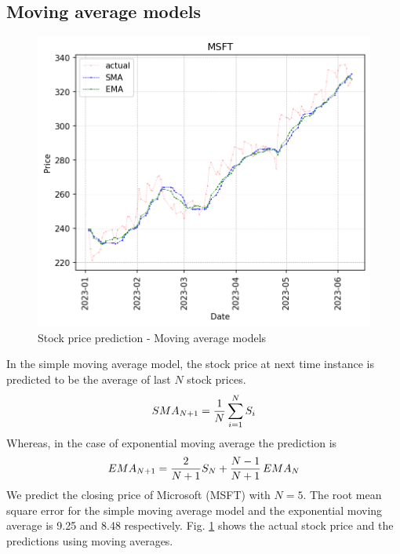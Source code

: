 \documentclass[11pt]{article}
\begin{document}
\subsection{Moving average models}
\begin{figure}[h]
	\centering
	\includegraphics[width = 0.75\linewidth]{graphics/moving_averages.png}
	\caption{Stock price prediction - Moving average models}
	\label{fig_moving_averages}
\end{figure}
In the simple moving average model, the stock price at next time instance is predicted to be the average of last $N$ stock prices.
\begin{equation}
	SMA_{N+1} = {1\over N} \sum\limits_{i = 1}^{N} S_i
\end{equation}
Whereas, in the case of exponential moving average the prediction is
\begin{equation}
EMA_{N+1} = {2\over N+1} S_N + {N-1 \over N+1} \, EMA_{N} 
\end{equation}
We predict the closing price of Microsoft (MSFT) with $N=5$. The root mean square error for the simple moving average model and the exponential moving average is 9.25 and 8.48 respectively. Fig. \ref{fig_moving_averages} shows the actual stock price and the predictions using moving averages.
\end{document}
